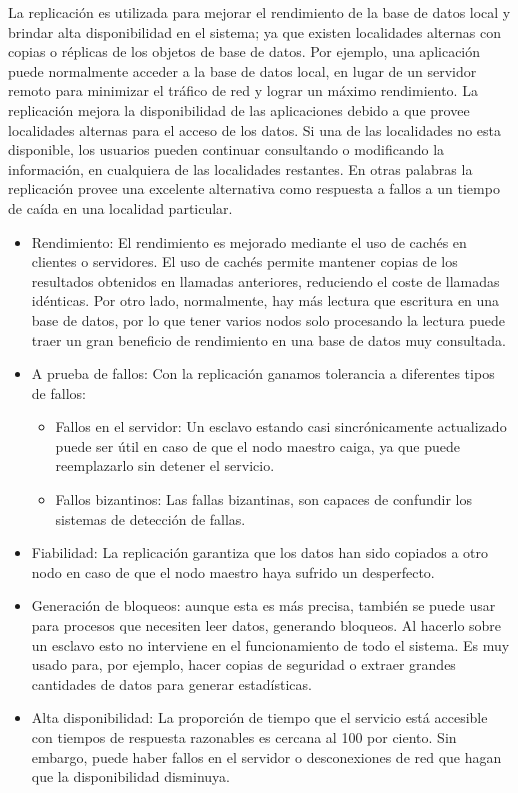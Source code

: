 \documentclass[twoside,twocolumn]{article}
\begin{document}
La replicación es utilizada para mejorar el  rendimiento de 
la base de datos local y brindar alta disponibilidad en el  
sistema; ya que existen  localidades alternas con copias o réplicas 
de los objetos de base de datos.    Por ejemplo, una aplicación puede 
normalmente acceder a la base de  datos  local,  en lugar de un  servidor
 remoto para minimizar el tráfico de red y  lograr un máximo  rendimiento.
  La replicación mejora la disponibilidad de las aplicaciones debido a que 
  provee localidades alternas para el  acceso de los datos. Si una  de las 
  localidades no esta disponible, los usuarios pueden continuar  consultando 
  o modificando la información, en cualquiera de las localidades restantes. En
    otras palabras la replicación provee una excelente alternativa como respuesta
     a fallos a  un tiempo de caída en una localidad particular. 
\begin{itemize}
   \item Rendimiento: El rendimiento es mejorado mediante el uso de cachés en clientes o servidores. El uso de cachés permite mantener copias de los resultados obtenidos en llamadas anteriores, reduciendo el coste de llamadas idénticas. Por otro lado, normalmente, hay más lectura que escritura en una base de datos, por lo que tener varios nodos solo procesando la lectura puede traer un gran beneficio de rendimiento en una base de datos muy consultada.
   \item A prueba de fallos: Con la replicación ganamos tolerancia a diferentes tipos de fallos:
   \begin{itemize}
      \item Fallos en el servidor: Un esclavo estando casi sincrónicamente actualizado puede ser útil en caso de que el nodo maestro caiga, ya que puede reemplazarlo sin detener el servicio. 
      \item Fallos bizantinos: Las fallas bizantinas, son capaces de confundir los sistemas de detección de fallas. 
   \end{itemize}
   \item Fiabilidad: La replicación garantiza que los datos han sido copiados a otro nodo en caso de que el nodo maestro haya sufrido un desperfecto.
   \item Generación de bloqueos: aunque esta es más precisa, también se puede usar para procesos que necesiten leer datos, generando bloqueos. Al hacerlo sobre un esclavo esto no interviene en el funcionamiento de todo el sistema. Es muy usado para, por ejemplo, hacer copias de seguridad o extraer grandes cantidades de datos para generar estadísticas. 
   \item Alta disponibilidad: La proporción de tiempo que el servicio está accesible con tiempos de respuesta razonables es cercana al 100 por ciento. Sin embargo, puede haber fallos en el servidor o desconexiones de red que hagan que la disponibilidad disminuya. 
\end{itemize}
 
\end{document}
